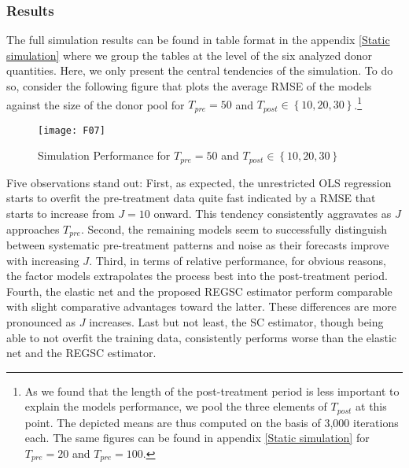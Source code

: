 \subsubsection{Results}
The full simulation results can be found in table format in the appendix \ref{Static simulation} where we group the tables at the level of the six analyzed donor quantities. Here, we only present the central tendencies of the simulation. To do so, consider the following figure that plots the average \ac{RMSE} of the models against the size of the donor pool for $T_{pre} = 50$ and $T_{post} \in \left\lbrace 10,20,30\right\rbrace$.\footnote{As we found that the length of the post-treatment period is less important to explain the models performance, we pool the three elements of $T_{post}$ at this point. The depicted means are thus computed on the basis of 3,000 iterations each. The same figures can be found in appendix \ref{Static simulation} for $T_{pre} = 20$ and $T_{pre} = 100$.} 



\begin{figure}[H]
	\centering
	\texttt{[image: F07]}
	\caption{Simulation Performance for $T_{pre} = 50$ and $T_{post} \in \left\lbrace 10,20,30\right\rbrace$}
	\label{F_07}
\end{figure}

Five observations stand out: First, as expected, the unrestricted \ac{OLS} regression starts to overfit the pre-treatment data quite fast indicated by a \ac{RMSE} that starts to increase from $J = 10$ onward. This tendency consistently aggravates as $J$ approaches $T_{pre}$. Second, the remaining models seem to successfully distinguish between systematic pre-treatment patterns and noise as their forecasts improve with increasing $J$. Third, in terms of relative performance, for obvious reasons, the factor models extrapolates the process best into the post-treatment period. Fourth, the elastic net and the proposed \ac{REGSC} estimator perform comparable with slight comparative advantages toward the latter. These differences are more pronounced as $J$ increases. Last but not least, the \ac{SC} estimator, though being able to not overfit the training data, consistently performs worse than the elastic net and the \ac{REGSC} estimator. 

